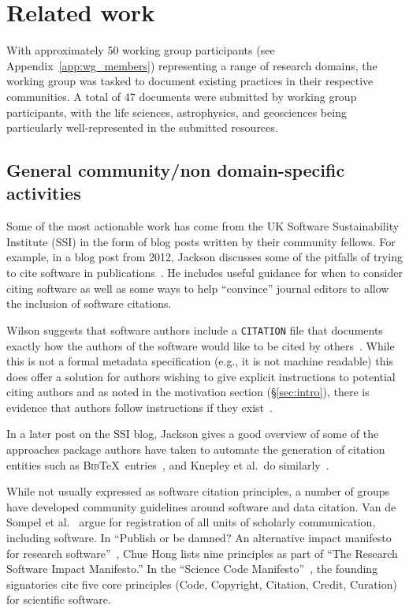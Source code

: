\documentclass[12pt, oneside]{amsart}
\begin{document}
\section{Related work}
\label{sec:related_work}

With approximately 50 working group participants (see Appendix~\ref{app:wg_members})
representing a range of research domains, the working group was tasked to
document existing practices in their respective communities. A total of 47
documents were submitted by working group participants, with the life sciences,
astrophysics, and geosciences being particularly well-represented in the
submitted resources.

\subsection{General community/non domain-specific activities}

Some of the most actionable work has come from the UK Software Sustainability
Institute (SSI) in the form of blog posts written by their community fellows.
For example, in a blog post from 2012, Jackson discusses some of the pitfalls
of trying to cite software in publications~\cite{ssi-how-to-cite}. He includes
useful guidance for when to consider citing software as well as some ways to help
``convince'' journal editors to allow the inclusion of software citations.

Wilson suggests that software authors include a \texttt{CITATION} file that
documents exactly how the authors of the software would like to be cited by
others~\cite{ssi-citation-files}. While this is not a formal metadata
specification (e.g., it is not machine readable) this does offer a solution for
authors wishing to give explicit instructions to potential citing authors and as
noted in the motivation section (\S\ref{sec:intro}), there is evidence that
authors follow instructions if they exist~\cite{10.1371/journal.pone.0136631}.

In a later post on the SSI blog, Jackson gives a good overview of some of the
approaches package authors have taken to automate the generation of citation
entities such as \textsc{Bib}\TeX\ entries~\cite{ssi-how-shalt-i-cite-thee}, and
Knepley et al.\ do similarly~\cite{knepley2013accurately}.

While not usually expressed as software citation principles, a number of groups
have developed community guidelines around software and data citation. Van de
Sompel et al.~\cite{VandeSompel2004} argue for registration of all units of
scholarly communication, including software. In ``Publish or be damned? An
alternative impact manifesto for research
software''~\cite{ssi-publish-or-be-damned}, Chue Hong lists nine principles as
part of ``The Research Software Impact Manifesto.'' In the
``Science Code Manifesto''~\cite{sciencecodemanifesto}, the founding signatories
cite five core principles (Code, Copyright, Citation, Credit, Curation) for
scientific software.
\end{document}

